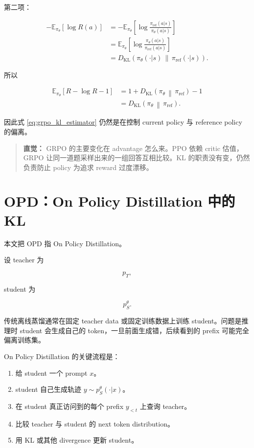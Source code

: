 \documentclass[11pt,a4paper]{ctexart}
\newcommand{\KL}[2]{D_{\mathrm{KL}}\!\left(#1\,\middle\|\,#2\right)}
\newcommand{\E}{\mathbb{E}}
\newcommand{\piref}{\pi_{\mathrm{ref}}}
\newcommand{\pitheta}{\pi_{\theta}}
\newenvironment{intuition}
{\begin{quote}\small\textbf{直觉：}}
{\end{quote}}
\begin{document}
第二项：

\begin{align}
-\E_{\pitheta}[\log R(a)]
&=
-\E_{\pitheta}
\left[
\log
\frac{\piref(a|s)}{\pitheta(a|s)}
\right]
\\
&=
\E_{\pitheta}
\left[
\log
\frac{\pitheta(a|s)}{\piref(a|s)}
\right]
\\
&=
\KL{\pitheta(\cdot|s)}{\piref(\cdot|s)}.
\end{align}

所以

\begin{align}
\E_{\pitheta}
[
R-\log R-1
]
&=
1
+
\KL{\pitheta}{\piref}
-
1
\\
&=
\KL{\pitheta}{\piref}.
\end{align}

因此式 \eqref{eq:grpo_kl_estimator} 仍然是在控制 current policy 与 reference policy 的偏离。

\begin{intuition}
GRPO 的主要变化在 advantage 怎么来。PPO 依赖 critic 估值，GRPO 让同一道题采样出来的一组回答互相比较。KL 的职责没有变，仍然负责防止 policy 为追求 reward 过度漂移。
\end{intuition}

\section{OPD：On Policy Distillation 中的 KL}

本文把 OPD 指 On Policy Distillation。

设 teacher 为

\[
p_T,
\]

student 为

\[
p_S^\theta.
\]

传统离线蒸馏通常在固定 teacher data 或固定训练数据上训练 student。问题是推理时 student 会生成自己的 token，一旦前面生成错，后续看到的 prefix 可能完全偏离训练集。

On Policy Distillation 的关键流程是：

\begin{enumerate}
    \item 给 student 一个 prompt $x$。
    \item student 自己生成轨迹 $y\sim p_S^\theta(\cdot|x)$。
    \item 在 student 真正访问到的每个 prefix $y_{<t}$ 上查询 teacher。
    \item 比较 teacher 与 student 的 next token distribution。
    \item 用 KL 或其他 divergence 更新 student。
\end{enumerate}
\end{document}
